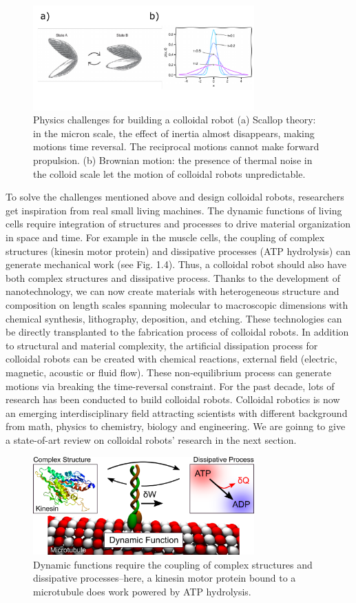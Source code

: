 \begin{figure}
\centering
\includegraphics[width=8.5cm]{figures/1_3.pdf}
\caption{Physics challenges for building a colloidal robot (a) Scallop theory: in the micron scale, the effect of inertia almost disappears, making motions time reversal. The reciprocal motions cannot make forward propulsion.  (b) Brownian motion: the presence of thermal noise in the colloid scale let the motion of colloidal robots unpredictable.}
\label{fig:1.3}
\end{figure}
To solve the  challenges mentioned above and design colloidal robots, researchers get inspiration from real small living  machines. The dynamic functions of living cells require integration of structures and processes to drive material organization in space and time. For example in the muscle cells,  the coupling of complex structures (kinesin motor protein) and dissipative processes (ATP hydrolysis) can generate mechanical work (see Fig. 1.4). Thus, a colloidal robot should also have both complex structures and dissipative process. Thanks to the development of nanotechnology, we can now create materials with heterogeneous structure and composition on length scales spanning molecular to macroscopic dimensions with chemical synthesis, lithography, deposition, and etching. These technologies can be directly transplanted to the fabrication process of colloidal robots. In addition to structural and material complexity, the artificial dissipation process for colloidal robots  can be created with chemical reactions, external field (electric, magnetic, acoustic or fluid flow). These non-equilibrium process can generate motions via breaking the time-reversal constraint. For the past decade, lots of research has been conducted to build colloidal robots. Colloidal robotics is now an emerging interdisciplinary field attracting scientists with different background from math, physics to chemistry, biology and engineering. We are goinng to give a state-of-art  review on colloidal robots' research in the next section.
\begin{figure}
\centering
\includegraphics[width=8.5cm]{figures/1_4.png}
\caption{Dynamic functions require the coupling of complex structures and dissipative processes–here, a kinesin motor protein bound to a microtubule  does work powered by ATP hydrolysis.}
\label{fig:1.4}
\end{figure}

